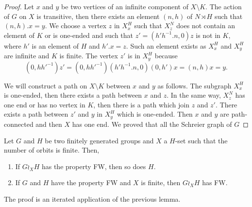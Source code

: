 \begin{proof}
Let $x$ and $y$ be two vertices of an infinite component of $X \setminus K$. The action of $G$ on $X$ is transitive, then there exists an element $(n,h)$ of $N \rtimes H$ such that $(n,h).x = y$. We choose a vertex $z$ in $X_x^H$ such that $X_z^N$ does not contain an element of $K$ or is one-ended and such that $z'=(h'h^{-1}.n,0)z$ is not in $K$, where $h'$ is an element of $H$ and $h'.x = z$. Such an element exists as $X_x^H$ and $X_y^H$ are infinite and $K$ is finite. The vertex $z'$ is in $X_y^H$ because
\begin{equation*}
(0,hh'^{-1}) z' = (0,hh'^{-1})(h'h^{-1}.n,0)(0,h')x = (n,h)x = y.
\end{equation*}
%

We will construct a path on $X \setminus K$ between $x$ and $y$ as follows. The subgraph $X_x^H$ is one-ended, then there exists a path between $x$ and $z$. In the same way, $X_z^N$ has one end or has no vertex in $K$, then there is a path which join $z$ and $z'$. There exists a path between $z'$ and $y$ in $X_y^H$ which is one-ended. Then $x$ and $y$ are path-connected and then $X$ has one end. We proved that all the Schreier graph of $G$
\end{proof}
%
%
\begin{cor}\label{Cor:Wreath_ends}
Let $G$ and $H$ be two finitely generated groups and $X$ a $H$-set such that the number of orbits is finite. Then,
\begin{enumerate}
\item
If $G\wr_X H$ has the property FW, then so does $H$.
\item
If $G$ and $H$ have the property FW and $X$ is finite, then $G\wr_X H$ has FW.
\end{enumerate}
\end{cor}
%
%
The proof is an iterated application of the previous lemma.
